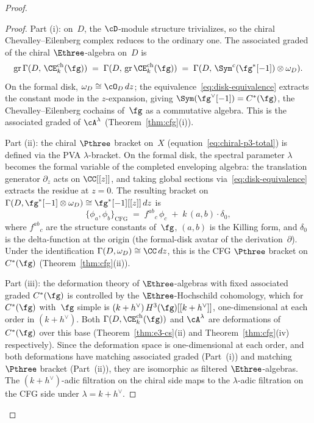 \begin{proof}
\begin{proof}
Part (i): on~$D$, the $\cD$-module structure trivializes,
so the chiral Chevalley--Eilenberg complex reduces to the
ordinary one. The associated graded of the chiral
$\Ethree$-algebra on~$D$ is
\[
  \mathrm{gr}\,\Gamma(D,\, \CE^{\mathrm{ch}}_k(\fg))
  \;=\;
  \Gamma(D,\, \mathrm{gr}\,\CE^{\mathrm{ch}}_k(\fg))
  \;=\;
  \Gamma(D,\, \Sym^c(\fg^*[-1]) \otimes \omega_D).
\]
On the formal disk, $\omega_D \cong \cO_D\,dz$; the
equivalence~\eqref{eq:disk-equivalence} extracts the
constant mode in the $z$-expansion, giving
$\Sym(\fg^\vee[-1]) = C^*(\fg)$, the
Chevalley--Eilenberg cochains of~$\fg$ as a commutative
algebra. This is the associated graded of $\cA^\lambda$
(Theorem~\ref{thm:cfg}(i)).

Part (ii): the chiral $\Pthree$ bracket on~$X$
(equation~\eqref{eq:chiral-p3-total}) is defined via the
PVA $\lambda$-bracket. On the formal disk, the spectral
parameter $\lambda$ becomes the formal variable of the
completed enveloping algebra: the translation generator
$\partial_z$ acts on $\CC[[z]]$, and taking global sections
via~\eqref{eq:disk-equivalence} extracts the residue at
$z = 0$. The resulting bracket on
$\Gamma(D, \fg^*[-1] \otimes \omega_D)
\cong \fg^*[-1][[z]]\,dz$ is
\[
  \{\phi_a, \phi_b\}_{\mathrm{CFG}}
  \;=\;
  f^{ab}{}_{c}\,\phi_c
  \;+\;
  k\,(a,b) \cdot \delta_0,
\]
where $f^{ab}{}_{c}$ are the structure constants of~$\fg$,
$(a,b)$ is the Killing form, and $\delta_0$ is the
delta-function at the origin (the formal-disk avatar of the
derivation~$\partial$). Under the identification
$\Gamma(D, \omega_D) \cong \CC\,dz$, this is the CFG
$\Pthree$ bracket on $C^*(\fg)$
(Theorem~\ref{thm:cfg}(ii)).

Part (iii): the deformation theory of $\Ethree$-algebras
with fixed associated graded $C^*(\fg)$ is controlled by
the $\Ethree$-Hochschild cohomology, which for
$C^*(\fg)$ with~$\fg$ simple is
$(k+h^\vee)\,H^3(\fg)[[k+h^\vee]]$, one-dimensional at each
order in $(k+h^\vee)$. Both
$\Gamma(D, \CE^{\mathrm{ch}}_k(\fg))$ and
$\cA^\lambda$ are deformations of $C^*(\fg)$ over this
base (Theorem~\ref{thm:e3-cs}(ii) and
Theorem~\ref{thm:cfg}(iv) respectively). Since the
deformation space is one-dimensional at each order, and
both deformations have matching associated graded
(Part~(i)) and matching $\Pthree$ bracket (Part~(ii)),
they are isomorphic as filtered $\Ethree$-algebras.
The $(k+h^\vee)$-adic filtration on the chiral side maps to
the $\lambda$-adic filtration on the CFG side under
$\lambda = k + h^\vee$.
\end{proof}


\end{proof}
